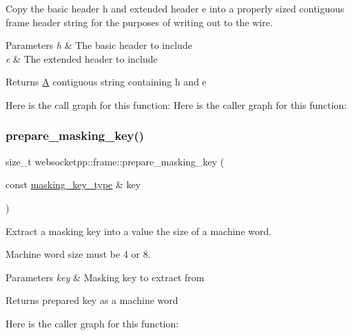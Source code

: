Copy the basic header h and extended header e into a properly sized contiguous frame header string for the purposes of writing out to the wire.


\begin{DoxyParams}{Parameters}
{\em h} & The basic header to include \\
\hline
{\em e} & The extended header to include\\
\hline
\end{DoxyParams}
\begin{DoxyReturn}{Returns}
\mbox{\hyperlink{struct_a}{A}} contiguous string containing h and e 
\end{DoxyReturn}
Here is the call graph for this function\+:
Here is the caller graph for this function\+:
\mbox{\label{namespacewebsocketpp_1_1frame_af80eee705eb39fb533cf4ab3d7a6d3bb}} 
\subsubsection{\texorpdfstring{prepare\+\_\+masking\+\_\+key()}{prepare\_masking\_key()}}
{\footnotesize\ttfamily size\+\_\+t websocketpp\+::frame\+::prepare\+\_\+masking\+\_\+key (\begin{DoxyParamCaption}\item[{const \mbox{\hyperlink{unionwebsocketpp_1_1frame_1_1uint32__converter}{masking\+\_\+key\+\_\+type}} \&}]{key }\end{DoxyParamCaption})\hspace{0.3cm}{\ttfamily [inline]}}



Extract a masking key into a value the size of a machine word. 

Machine word size must be 4 or 8.


\begin{DoxyParams}{Parameters}
{\em key} & Masking key to extract from\\
\hline
\end{DoxyParams}
\begin{DoxyReturn}{Returns}
prepared key as a machine word 
\end{DoxyReturn}
Here is the caller graph for this function\+:
\mbox{\label{namespacewebsocketpp_1_1frame_abe746242507916e5d6ae2ca26bd9f69e}} 
